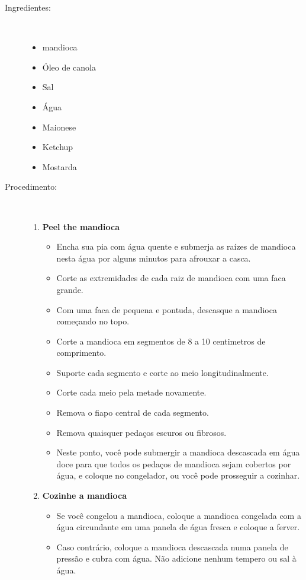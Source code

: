 \documentclass [11pt, letterpaper] {article}
\begin{document}
\begin {description}

\item [Ingredientes:] \ \\
\begin {itemize}
\item mandioca
\item Óleo de canola
\item Sal
\item Água
\item Maionese
\item Ketchup
\item Mostarda
\end {itemize}


\item [Procedimento:] \ \\
\begin {enumerate}
\item {\bf Peel the mandioca}
\begin {itemize}
\item Encha sua pia com água quente e submerja as ra\'izes de mandioca nesta água por alguns minutos para afrouxar a casca.
\item Corte as extremidades de cada raiz de mandioca com uma faca grande.
        \item Com uma faca de pequena e pontuda, descasque a mandioca começando no topo.
\item Corte a mandioca em segmentos de 8 a 10 centimetros de comprimento.
\item Suporte cada segmento e corte ao meio longitudinalmente.
\item Corte cada meio pela metade novamente.
\item Remova o fiapo central de cada segmento.
\item Remova quaisquer peda\c{c}os escuros ou fibrosos.
\item Neste ponto, você pode submergir a mandioca descascada em água doce para que todos os pedaços de mandioca sejam cobertos por água, e coloque no congelador, ou você pode prosseguir a cozinhar.
\end {itemize}
\item {\bf Cozinhe a mandioca}
\begin {itemize}
\item Se você congelou a mandioca, coloque a mandioca congelada com a água circundante em uma panela de água fresca e coloque a ferver.
\item Caso contrário, coloque a mandioca descascada numa panela de press\~ao e cubra com água. Não adicione nenhum tempero ou sal à água.

\end{itemize}
\end{enumerate}
\end{description}
\end{document}
